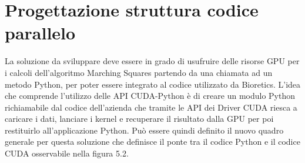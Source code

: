 \documentclass[12pt,a4paper]{report}
\begin{document}
\newpage
\section{Progettazione struttura codice parallelo}
La soluzione da sviluppare deve essere in grado di usufruire delle risorse GPU per i calcoli dell'algoritmo Marching Squares partendo da una chiamata ad un metodo Python, per poter essere integrato al codice utilizzato da Bioretics. \newline
L'idea che comprende l'utilizzo delle API CUDA-Python è di creare un modulo Python richiamabile dal codice dell'azienda che tramite le API dei Driver CUDA riesca a caricare i dati, lanciare i kernel e recuperare il risultato dalla GPU per poi restituirlo all'applicazione Python. \newline
Può essere quindi definito il nuovo quadro generale per questa soluzione che definisce il ponte tra il codice Python e il codice CUDA osservabile nella figura 5.2. \\[10pt]

\begin{figure}[H]
\centering
\begin{floatrow}[1]
\end{floatrow}
\end{figure} \newpage
\end{document}
